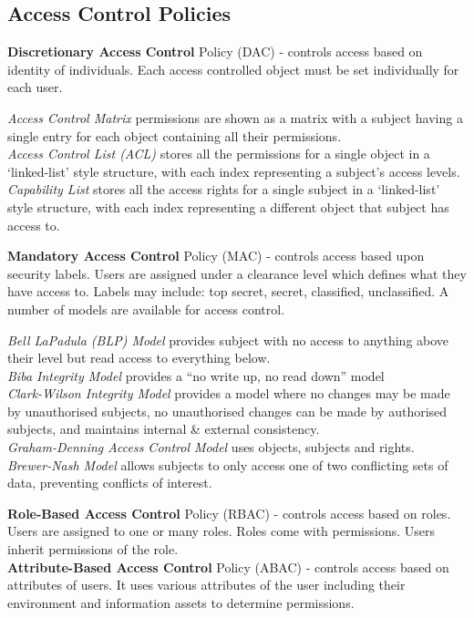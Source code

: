 \documentclass[a4paper,11pt]{article}
\begin{document}
\subsection{Access Control Policies}
\textbf{Discretionary Access Control} Policy (DAC) - controls access based on identity of individuals. Each access controlled object must be set individually for each user.
\begin{adjustwidth}{2em}{1em}
\textit{Access Control Matrix} permissions are shown as a matrix with a subject having a single entry for each object containing all their permissions.\\
\textit{Access Control List (ACL)} stores all the permissions for a single object in a `linked-list' style structure, with each index representing a subject's access levels.\\
\textit{Capability List} stores all the access rights for a single subject in a `linked-list' style structure, with each index representing a different object that subject has access to.
\end{adjustwidth}
\textbf{Mandatory Access Control} Policy (MAC) - controls access based upon security labels. Users are assigned under a clearance level which defines what they have access to. Labels may include: top secret, secret, classified, unclassified. A number of models are available for access control.
\begin{adjustwidth}{2em}{1em}
\textit{Bell LaPadula (BLP) Model} provides subject with no access to anything above their level but read access to everything below.\\
\textit{Biba Integrity Model} provides a ``no write up, no read down'' model\\
\textit{Clark-Wilson Integrity Model} provides a model where no changes may be made by unauthorised subjects, no unauthorised changes can be made by authorised subjects, and maintains internal \& external consistency.\\
\textit{Graham-Denning Access Control Model} uses objects, subjects and rights.\\
\textit{Brewer-Nash Model} allows subjects to only access one of two conflicting sets of data, preventing conflicts of interest.
\end{adjustwidth}
\textbf{Role-Based Access Control} Policy (RBAC) - controls access based on roles. Users are assigned to one or many roles. Roles come with permissions. Users inherit permissions of the role.\\
\textbf{Attribute-Based Access Control} Policy (ABAC) - controls access based on attributes of users. It uses various attributes of the user including their environment and information assets to determine permissions.\\
\end{document}
